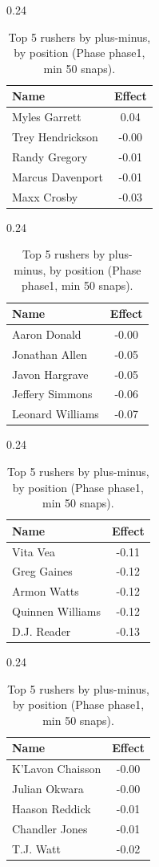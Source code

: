 \begin{table}[h!]
\centering
\begin{subtable}{0.24\textwidth}
\centering
\footnotesize
\begin{tabular}{lc}
\toprule
Name & Effect \\
\midrule
Myles Garrett & 0.04 \\
Trey Hendrickson & -0.00 \\
Randy Gregory & -0.01 \\
Marcus Davenport & -0.01 \\
Maxx Crosby & -0.03 \\
\bottomrule
\end{tabular}
\caption{DE}
\end{subtable}
\hfill
\begin{subtable}{0.24\textwidth}
\centering
\footnotesize
\begin{tabular}{lc}
\toprule
Name & Effect \\
\midrule
Aaron Donald & -0.00 \\
Jonathan Allen & -0.05 \\
Javon Hargrave & -0.05 \\
Jeffery Simmons & -0.06 \\
Leonard Williams & -0.07 \\
\bottomrule
\end{tabular}
\caption{DT}
\end{subtable}
\hfill
\begin{subtable}{0.24\textwidth}
\centering
\footnotesize
\begin{tabular}{lc}
\toprule
Name & Effect \\
\midrule
Vita Vea & -0.11 \\
Greg Gaines & -0.12 \\
Armon Watts & -0.12 \\
Quinnen Williams & -0.12 \\
D.J. Reader & -0.13 \\
\bottomrule
\end{tabular}
\caption{NT}
\end{subtable}
\hfill
\begin{subtable}{0.24\textwidth}
\centering
\footnotesize
\begin{tabular}{lc}
\toprule
Name & Effect \\
\midrule
K'Lavon Chaisson & -0.00 \\
Julian Okwara & -0.00 \\
Haason Reddick & -0.01 \\
Chandler Jones & -0.01 \\
T.J. Watt & -0.02 \\
\bottomrule
\end{tabular}
\caption{OLB}
\end{subtable}
\caption{Top 5 rushers by plus-minus, by position (Phase phase1, min 50 snaps).}
\label{tab:rusher_pm_phase1_top}
\end{table}

